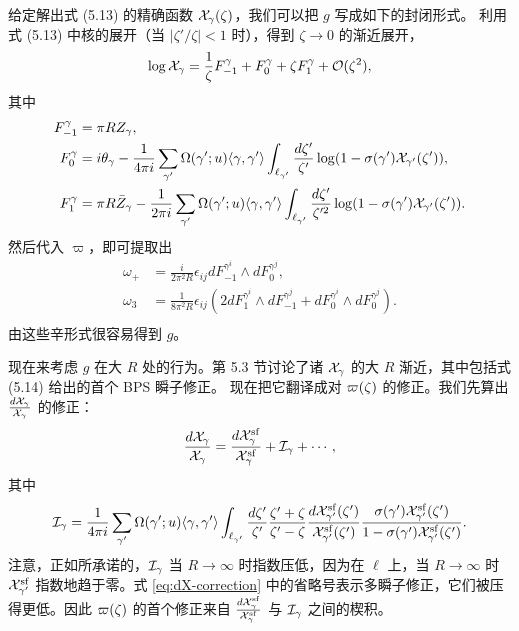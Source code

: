 给定解出式 (5.13) 的精确函数 $\mathcal{X}_\gamma(\zeta)$，我们可以把 $g$ 写成如下的封闭形式。%
利用式 (5.13) 中核的展开（当 $|\zeta'/\zeta| < 1$ 时），得到 $\zeta \to 0$ 的渐近展开，%
\begin{equation}
\log \mathcal{X}_{\gamma} = \frac{1}{\zeta} F_{-1}^\gamma + F_0^\gamma +
\zeta F_1^\gamma + \mathcal{O}(\zeta^2),
\end{equation}
其中
\begin{equation}
\begin{split}
F_{-1}^{\gamma} & = \pi R Z_\gamma, \\
F_0^\gamma & = i \theta_\gamma -  \frac{1}{4 \pi i} \sum_{\gamma'}
\Omega(\gamma';u) \langle \gamma,\gamma' \rangle
\int_{\ell_{\gamma'}} \frac{d\zeta'}{\zeta'}   \log (1-
\sigma(\gamma') \mathcal{X}_{\gamma'}(\zeta')),\\
F_1^\gamma & = \pi R \bar Z_\gamma -  \frac{1}{2 \pi i}
\sum_{\gamma'} \Omega(\gamma';u) \langle \gamma,\gamma' \rangle
\int_{\ell_{\gamma'}} \frac{d\zeta'}{\zeta'^2}   \log (1-
\sigma(\gamma') \mathcal{X}_{\gamma'}(\zeta')).
\end{split}
\end{equation}
然后代入 $\varpi$，即可提取出
\begin{equation}
\begin{split}
\omega_+ & = \frac{i}{2\pi^2 R} \epsilon_{ij} dF_{-1}^{\gamma^i}
\wedge d F_0^{\gamma^j}, \\
\omega_3 & = \frac{1}{8\pi^2 R} \epsilon_{ij} \left( 2
dF_1^{\gamma^i}\wedge d F_{-1}^{\gamma^j} + d F_0^{\gamma^i} \wedge
d
F_0^{\gamma^j} \right).\\
\end{split}
\end{equation}
由这些辛形式很容易得到 $g$。

现在来考虑 $g$ 在大 $R$ 处的行为。第 5.3 节讨论了诸 $\mathcal{X}_\gamma$ 的大 $R$ 渐近，其中包括式 (5.14) 给出的首个 BPS 瞬子修正。%
现在把它翻译成对 $\varpi(\zeta)$ 的修正。我们先算出 $\frac{d\mathcal{X}_\gamma}{\mathcal{X}_\gamma}$ 的修正：
\begin{equation} \label{eq:dX-correction}
\frac{d\mathcal{X}_\gamma}{\mathcal{X}_\gamma} = \frac{d\mathcal{X}^{\mathrm{sf}}_\gamma}{\mathcal{X}^{\mathrm{sf}}_\gamma} + \mathcal{I}_\gamma + \cdots,
\end{equation}
其中
\begin{equation} \label{eq:correction-integral}
\mathcal{I}_\gamma =  \frac{1}{4\pi i} \sum_{\gamma'} \Omega(\gamma';u)
\langle \gamma,\gamma' \rangle \int_{\ell_{\gamma'}}
\frac{d\zeta'}{\zeta'} \frac{\zeta' + \zeta}{\zeta' - \zeta}
\frac{d\mathcal{X}^{\mathrm{sf}}_{\gamma'}(\zeta')}{\mathcal{X}^{\mathrm{sf}}_{\gamma'}(\zeta')}
\frac{\sigma(\gamma') \mathcal{X}^{\mathrm{sf}}_{\gamma'}(\zeta')}{1- \sigma(\gamma')
\mathcal{X}^{\mathrm{sf}}_{\gamma'}(\zeta')}.
\end{equation}
注意，正如所承诺的，$\mathcal{I}_\gamma$ 当 $R \to \infty$ 时指数压低，因为在 $\ell$ 上，当 $R \to \infty$ 时 $\mathcal{X}_{\gamma'}^{\mathrm{sf}}$ 指数地趋于零。式 \eqref{eq:dX-correction} 中的省略号表示多瞬子修正，它们被压得更低。因此 $\varpi(\zeta)$ 的首个修正来自 $\frac{d\mathcal{X}^{\mathrm{sf}}_\gamma}{\mathcal{X}^{\mathrm{sf}}_\gamma}$ 与 $\mathcal{I}_\gamma$ 之间的楔积。

